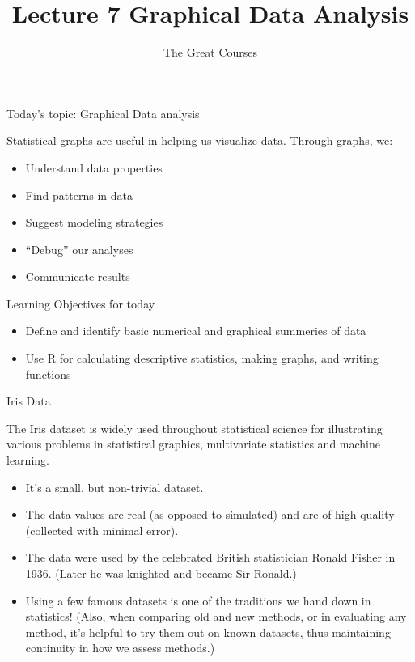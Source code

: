 \documentclass[ignorenonframetext,]{beamer}
\title{Lecture 7 Graphical Data Analysis}
\author{The Great Courses}
\date{}
\providecommand{\tightlist}{%
  \setlength{\itemsep}{0pt}\setlength{\parskip}{0pt}}
\begin{document}
\frame{\titlepage}

\begin{frame}{Today's topic: Graphical Data analysis}

Statistical graphs are useful in helping us visualize data. Through
graphs, we:

\begin{itemize}
\tightlist
\item
  Understand data properties
\item
  Find patterns in data
\item
  Suggest modeling strategies
\item
  ``Debug'' our analyses
\item
  Communicate results
\end{itemize}

\end{frame}

\begin{frame}{Learning Objectives for today}

\begin{itemize}
\item
  Define and identify basic numerical and graphical summeries of data
\item
  Use R for calculating descriptive statistics, making graphs, and
  writing functions
\end{itemize}

\end{frame}

\begin{frame}{Iris Data}

The Iris dataset is widely used throughout statistical science for
illustrating various problems in statistical graphics, multivariate
statistics and machine learning.

\begin{itemize}
\item
  It's a small, but non-trivial dataset.
\item
  The data values are real (as opposed to simulated) and are of high
  quality (collected with minimal error).
\item
  The data were used by the celebrated British statistician Ronald
  Fisher in 1936. (Later he was knighted and became Sir Ronald.)
\item
  Using a few famous datasets is one of the traditions we hand down in
  statistics! (Also, when comparing old and new methods, or in
  evaluating any method, it's helpful to try them out on known datasets,
  thus maintaining continuity in how we assess methods.)
\end{itemize}

\end{frame}
\end{document}
